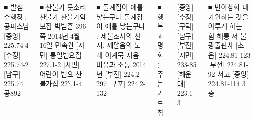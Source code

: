 \documentclass[	20pt, 
							a1paper, 
							landscape, %
							margin=0mm, %
							innermargin=10mm,  		%
							blockverticalspace=4mm, %
							colspace=5mm, 
							subcolspace=0mm
							]{tikzposter}
\begin{document}
\begin{columns}
			\block 
			{■  발심수행장 : 공파스님 }
			{				
			[중앙] 225.74-4 
			[수정] 225.74-2 
			[남구] 225.74공892
			}


			\block 
			{■  찬불가 }
			{				
			뭇소리 찬불가 찬불가악보집 박범훈 396쪽 2014년 4월 16일 민속원
			[시민] 통일법요집 227.1-2 
			[시민] 어린이 법요 찬불가집 227.1-4 
		}



			\block 
			{■  돌계집이 애를 낳는구나 }
			{				
			돌계집이 애를 낳는구나 : 제불조사의 선시, 깨달음의 노래	이계묵 지음 비움과 소통 2014년
			[부전] 224.2-297  
			[구포] 224.2-132
		}



			\block 
			{■ 행복과 평화를 주는 가르침 }
		{
[중앙] 
[수정] 
[구덕]
[남구] 
[부전] 
[시민] 233-85
[해운대] 223.1-3

		}		





			\block 
			{■ 반야참회 내가원하는 것을 이루게 하는 힘 }
			{				
해룡 저 불광출판사
[초읍] 224.81-123
[부전] 224.81-92 서고
[중앙] 224.81-114 3층
		}







	\end{columns}
\end{document}

